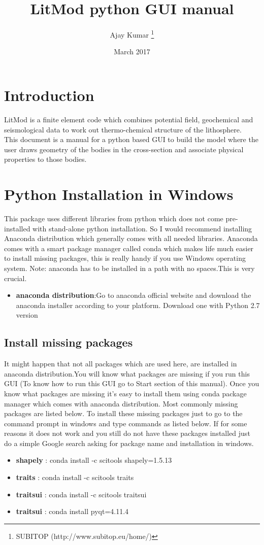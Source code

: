 \documentclass[12pt]{article}
\title{LitMod python GUI manual}
\author[1]{Ajay Kumar \thanks{SUBITOP (http://www.subitop.eu/home/)}}
\affil[1]{Group of Dynamics of the Lithosphere, ICTJA-CSIC Barcelona, Spain \\ Email: ajay6763@gmail.com}
\date{March 2017}
\begin{document}
\begin{titlepage}
\maketitle
\end{titlepage}

\section{Introduction}
LitMod is a finite element code which combines potential field, geochemical and seismological data to work out thermo-chemical structure of the lithosphere.\\
This document is a manual for a python based GUI to build the model where the user draws geometry of the bodies in the cross-section and associate physical properties to those bodies.

\section{Python Installation in Windows}
This package uses different libraries from python which does not come pre-installed with stand-alone python installation. So I would recommend installing Anaconda distribution which generally comes with all needed libraries. Anaconda comes with a smart package manager called conda which makes life much easier to install missing packages, this is really handy if you use Windows operating system. Note: anaconda has to be installed in a path with no spaces.This is very crucial.
\begin{itemize}
\item \textbf{anaconda distribution}:Go to anaconda official website and download the anaconda installer according to your platform. Download one with   Python 2.7 version
\end{itemize}
\subsection{Install missing packages}
It might happen that not all packages which are used here, are installed in anaconda distribution.You will know what packages are missing if you run this GUI (To know how to run this GUI go to Start section of this manual). Once you know what packages are missing it's easy to install them using conda package manager which comes with anaconda distribution. Most commonly missing packages are listed below. To install these missing packages just to go to the command prompt in windows and type commands as listed below. If for some reasons it does not work and you still do not have these packages installed just do a simple Google search asking for package name and installation in windows.
\begin{itemize}
\item \textbf{shapely} : conda install -c scitools shapely=1.5.13
\item \textbf{traits} : conda install -c scitools traits
\item \textbf{traitsui} : conda install -c scitools traitsui
\item \textbf{traitsui} : conda install pyqt=4.11.4

\end{itemize}
\end{document}
